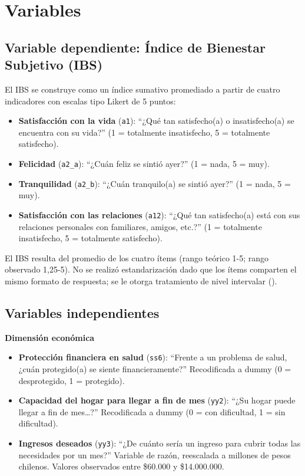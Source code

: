 \documentclass[
  spanish,
  a4paper,
  oneside]{scrbook}
\providecommand{\tightlist}{%
  \setlength{\itemsep}{0pt}\setlength{\parskip}{0pt}}
\begin{document}
\section{Variables}\label{variables}

\subsection{Variable dependiente: Índice de Bienestar Subjetivo
(IBS)}\label{variable-dependiente-uxedndice-de-bienestar-subjetivo-ibs}

El IBS se construye como un índice sumativo promediado a partir de
cuatro indicadores con escalas tipo Likert de 5 puntos:

\begin{itemize}
\tightlist
\item
  \textbf{Satisfacción con la vida} (\texttt{a1}): ``¿Qué tan
  satisfecho(a) o insatisfecho(a) se encuentra con su vida?'' (1 =
  totalmente insatisfecho, 5 = totalmente satisfecho).
\item
  \textbf{Felicidad} (\texttt{a2\_a}): ``¿Cuán feliz se sintió ayer?''
  (1 = nada, 5 = muy).
\item
  \textbf{Tranquilidad} (\texttt{a2\_b}): ``¿Cuán tranquilo(a) se sintió
  ayer?'' (1 = nada, 5 = muy).
\item
  \textbf{Satisfacción con las relaciones} (\texttt{a12}): ``¿Qué tan
  satisfecho(a) está con sus relaciones personales con familiares,
  amigos, etc.?'' (1 = totalmente insatisfecho, 5 = totalmente
  satisfecho).
\end{itemize}

El IBS resulta del promedio de los cuatro ítems (rango teórico 1-5;
rango observado 1,25-5). No se realizó estandarización dado que los
ítems comparten el mismo formato de respuesta; se le otorga tratamiento
de nivel intervalar ().

\subsection{Variables independientes}\label{variables-independientes}

\textbf{Dimensión económica}

\begin{itemize}
\tightlist
\item
  \textbf{Protección financiera en salud} (\texttt{ss6}): ``Frente a un
  problema de salud, ¿cuán protegido(a) se siente financieramente?''
  Recodificada a dummy (0 = desprotegido, 1 = protegido).
\item
  \textbf{Capacidad del hogar para llegar a fin de mes} (\texttt{yy2}):
  ``¿Su hogar puede llegar a fin de mes\ldots?'' Recodificada a dummy (0
  = con dificultad, 1 = sin dificultad).
\item
  \textbf{Ingresos deseados} (\texttt{yy3}): ``¿De cuánto sería un
  ingreso para cubrir todas las necesidades por un mes?'' Variable de
  razón, reescalada a millones de pesos chilenos. Valores observados
  entre \$60.000 y \$14.000.000.
\end{itemize}
\end{document}

